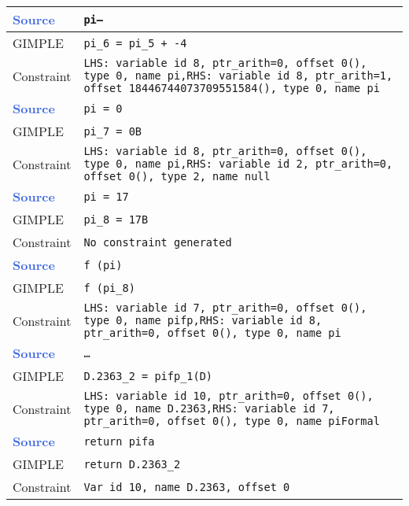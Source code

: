 \begin{center}
\begin{longtable}{| m{10ex} | m{75ex} |}
            \hline
            \hline
            \textcolor{RoyalBlue}{\textbf{Source}} & \texttt{pi--} \\ \hline
            GIMPLE & \texttt{pi\_6 = pi\_5 + -4} \\ \hline
            Constraint & \texttt{LHS: variable id 8, ptr\_arith=0, offset 0(), type 0, name pi,\newline RHS: variable id 8, ptr\_arith=1, offset 18446744073709551584(), type 0, name pi} \\
            \hline
            \hline
            \textcolor{RoyalBlue}{\textbf{Source}} & \texttt{pi = 0} \\ \hline
            GIMPLE & \texttt{pi\_7 = 0B} \\ \hline
            Constraint & \texttt{LHS: variable id 8, ptr\_arith=0, offset 0(), type 0, name pi,\newline RHS: variable id 2, ptr\_arith=0, offset 0(), type 2, name null} \\
            \hline
            \hline
            \textcolor{RoyalBlue}{\textbf{Source}} & \texttt{pi = 17} \\ \hline
            GIMPLE & \texttt{pi\_8 = 17B} \\ \hline
            Constraint & \texttt{\textcolor{BrickRed}{No constraint generated}} \\
            \hline
            \hline
            \textcolor{RoyalBlue}{\textbf{Source}} & \texttt{f (pi)} \\ \hline
            GIMPLE & \texttt{f (pi\_8)} \\ \hline
            Constraint & \texttt{LHS: variable id 7, ptr\_arith=0, offset 0(), type 0, name pifp,\newline RHS: variable id 8, ptr\_arith=0, offset 0(), type 0, name pi} \\
            \hline
            \hline
            \textcolor{RoyalBlue}{\textbf{Source}} & \texttt{\ldots} \\ \hline
            GIMPLE & \texttt{D.2363\_2 = pifp\_1(D)} \\ \hline
            Constraint & \texttt{LHS: variable id 10, ptr\_arith=0, offset 0(), type 0, name D.2363,\newline RHS: variable id 7, ptr\_arith=0, offset 0(), type 0, name piFormal} \\
            \hline
            \hline
            \textcolor{RoyalBlue}{\textbf{Source}} & \texttt{return pifa} \\ \hline
            GIMPLE & \texttt{return D.2363\_2} \\ \hline
            Constraint & \texttt{Var id 10, name D.2363, offset 0} \\
            \hline
        \end{longtable}
    \end{center}

